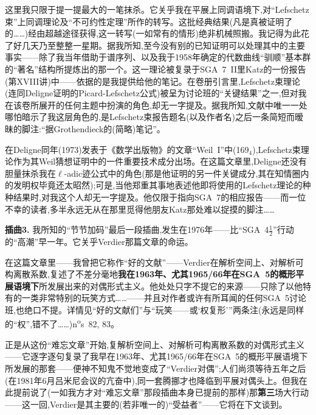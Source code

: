 这里我只限于提一提最大的一笔抹杀。它关乎我在平展上同调语境下,对“Lefschetz束”上同调理论及“不可约性定理”所作的转写。这批经典结果(凡是真被证明了的……)经由超越途径获得,这一转写(一如常有的情形)绝非机械照搬。我记得为此花了好几天乃至整整一星期。据我所知,至今没有别的已知证明可以处理其中的主要事实——除了我当年借助于谱序列、以及我于1958年确定的代数曲线“驯顺”基本群的“著名”结构所提炼出的那一个。这一理论被复录于SGA~7~II里Katz的一份报告(第XVIII讲)中——依据的是我提供给他的笔记。在卷册引言里,Lefschetz束理论(连同Deligne证明的Picard-Lefschetz公式)被呈为讨论班的“关键结果”之一,但对我在该卷所展开的任何主题中扮演的角色,却无一字提及。据我所知,文献中唯一一处哪怕暗示了我这层角色的,是Lefschetz束报告题名(以及作者名)之后一条简短而暧昧的脚注:“据Grothendieck的(简略)笔记”。

在Deligne同年(1973)发表于《数学出版物》的文章“Weil~I”中(169$_4$),Lefschetz束理论作为其Weil猜想证明中的一件重要技术成分出场。在这篇文章里,Deligne还没有胆量抹杀我在$\ell$-adic迹公式中的角色(那是他证明的另一件关键成分,其在知情圈内的发明权毕竟还太昭然);可是,当他郑重其事地表述他即将使用的Lefschetz理论的种种结果时,对我这个人却无一字提及。他仅限于指向SGA~7的相应报告——而一位不幸的读者,多半永远无从在那里觅得他朋友Katz那处难以捉摸的脚注……

\textbf{插曲3.} 我所知的“节节加码”最后一段插曲,发生在1976年——比“SGA~4$\frac{1}{2}$”行动的“高潮”早一年。它关乎Verdier那篇文章的命运\dmark{}。

在这篇文章里——我曾把它称作“好的文献”——Verdier在解析空间上、对解析可构离散系数,复述了不差分毫地\textbf{我在1963年、尤其1965/66年在SGA~5的概形平展语境下}所发展出来的对偶形式主义。他处处只字不提它的来源——只除了以他特有的一类非常特别的玩笑方式……——并且对作者或许有所耳闻的任何SGA~5讨论班,也绝口不提。详情见“好的文献们”与“玩笑——或‘权复形’”两条注(永远是同样的“权”,错不了……)n\textsuperscript{o}s~82, 83。

正是从这份“难忘文章”开始,复解析空间上、对解析可构离散系数的对偶形式主义——它逐字逐句复录了我早在1963年、尤其1965/66年在SGA~5的概形平展语境下所发展的那套——便神不知鬼不觉地变成了“Verdier对偶”;人们尚须等待五年之后(在1981年6月吕米尼会议的亢奋中),同一套腾挪才也降临到平展对偶头上。但我在此提前说了(一如我方才对“难忘文章”那段插曲本身已提前的那样)那\textbf{第三}场大行动——这一回,Verdier是其主要的(若非唯一的)“受益者”——它将在下文谈到。

